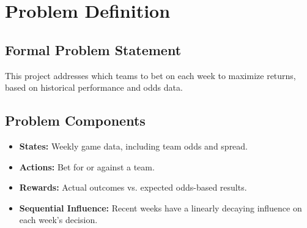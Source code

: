 \section{Problem Definition}
    \subsection{Formal Problem Statement}
    This project addresses which teams to bet on each week to maximize returns, based on historical performance and odds data.

    \subsection{Problem Components}
    \begin{itemize}
        \item \textbf{States:} Weekly game data, including team odds and spread.
        \item \textbf{Actions:} Bet for or against a team.
        \item \textbf{Rewards:} Actual outcomes vs. expected odds-based results.
        \item \textbf{Sequential Influence:} Recent weeks have a linearly decaying influence on each week’s decision.
    \end{itemize}